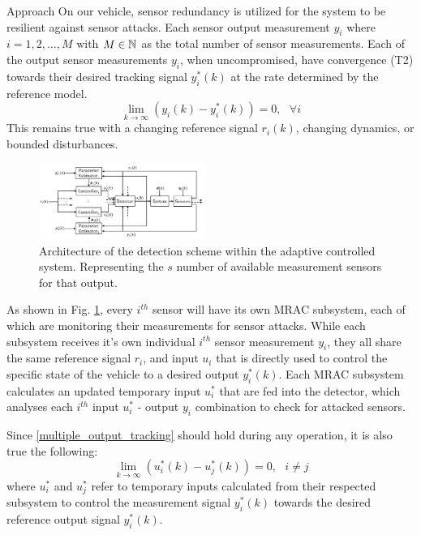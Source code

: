 \begin{section}{Approach}
On our vehicle, sensor redundancy is utilized for the system to be resilient against sensor attacks. Each sensor output measurement $y_i$ where $i=1,2,\dots,M$ with $M \in \mathbb{N}$ as the total number of sensor measurements. Each of the output sensor measurements $y_i$, when uncompromised, have convergence (T2) towards their desired tracking signal $y_i^*(k)$ at the rate determined by the reference model. 
    \begin{equation}
    \label{multiple_output_tracking}
    \lim_{k\to\infty}(y_i(k)-y^*_i(k))=0, \text{ }\forall i
    \end{equation}
This remains true with a changing reference signal $r_i(k)$, changing dynamics, or bounded disturbances. 

\begin{figure}[ht!]
\vspace{1pt}
\centering
\includegraphics[width=0.48\textwidth]{con_and_det.png}
\caption{Architecture of the detection scheme within the adaptive controlled system. Representing  the $s$ number of available measurement sensors for that output.}
\label{fig:det_arch}
\end{figure}

As shown in Fig. \ref{fig:det_arch}, every $i^{th}$ sensor will have its own MRAC subsystem, each of which are monitoring their measurements for sensor attacks. While each subsystem receives it's own individual $i^{th}$ sensor measurement $y_i$, they all share the same reference signal $r_i$, and input $u_i$ that is directly used to control the specific state of the vehicle to a desired output $y_i^*(k)$. Each MRAC subsystem calculates an updated temporary input $u^*_i$ that are fed into the detector, which analyses each $i^{th}$ input $u^*_i$ - output $y_i$ combination to check for attacked sensors. 



Since \eqref{multiple_output_tracking} should hold during any operation, it is also true the following:
\begin{equation}
    \lim_{k\to\infty}(u^*_i(k)-u^*_j(k))=0, \text{ }i\neq j
\end{equation}
where $u^*_i$ and $u^*_j$ refer to temporary inputs calculated from their respected subsystem to control the measurement signal $y_i^*(k)$ towards the desired reference output signal $y_i^*(k)$.


\end{section}
